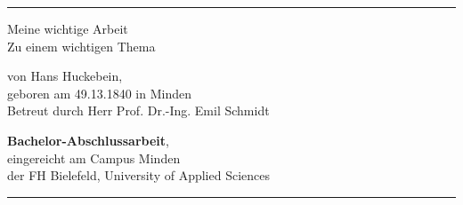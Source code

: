 %
%
%
%

\begin{titlepage}
    \hrule
	\vspace*{3cm}
	\begin{center}
		{\LARGE \sc Meine wichtige Arbeit \\[2pt] Zu einem wichtigen Thema}

			\vspace*{20pt}
			{\Large von Hans Huckebein, \\
			geboren am 49.13.1840 in Minden \\
			Betreut durch Herr Prof. Dr.-Ing. Emil Schmidt}

			\vspace*{48pt}
			{\bf Bachelor-Abschlussarbeit},\\
			eingereicht am Campus Minden\\
			der FH Bielefeld, University of Applied Sciences\\
			
			\vspace*{72pt}
			\noindent{\today}
		
		\vspace*{100pt}
		
	\end{center}
	\vfill
    \hrule
\end{titlepage}